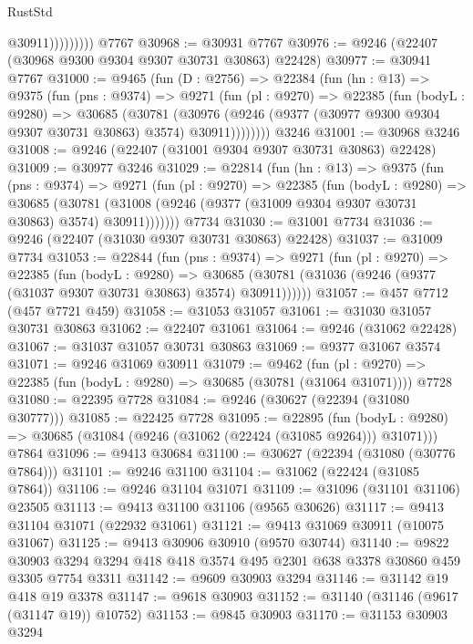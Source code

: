 \begin{lexlean}{RustStd}
\begin{coremodule}
                      @30911)))))))))
    @7767
@30968 := @30931 @7767
@30976 := @9246 (@22407 (@30968 @9300 @9304 @9307 @30731 @30863) @22428)
@30977 := @30941 @7767
@31000 := @9465
    (fun (D : @2756) =>
    @22384
      (fun (hn : @13) =>
      @9375
        (fun (pns : @9374) =>
        @9271
          (fun (pl : @9270) =>
          @22385
            (fun (bodyL : @9280) =>
            @30685
              (@30781
                (@30976 (@9246 (@9377 (@30977 @9300 @9304 @9307 @30731 @30863) @3574) @30911))))))))
    @3246
@31001 := @30968 @3246
@31008 := @9246 (@22407 (@31001 @9304 @9307 @30731 @30863) @22428)
@31009 := @30977 @3246
@31029 := @22814
    (fun (hn : @13) =>
    @9375
      (fun (pns : @9374) =>
      @9271
        (fun (pl : @9270) =>
        @22385
          (fun (bodyL : @9280) =>
          @30685
            (@30781 (@31008 (@9246 (@9377 (@31009 @9304 @9307 @30731 @30863) @3574) @30911)))))))
    @7734
@31030 := @31001 @7734
@31036 := @9246 (@22407 (@31030 @9307 @30731 @30863) @22428)
@31037 := @31009 @7734
@31053 := @22844
    (fun (pns : @9374) =>
    @9271
      (fun (pl : @9270) =>
      @22385
        (fun (bodyL : @9280) =>
        @30685 (@30781 (@31036 (@9246 (@9377 (@31037 @9307 @30731 @30863) @3574) @30911))))))
@31057 := @457 @7712 (@457 @7721 @459)
@31058 := @31053 @31057
@31061 := @31030 @31057 @30731 @30863
@31062 := @22407 @31061
@31064 := @9246 (@31062 @22428)
@31067 := @31037 @31057 @30731 @30863
@31069 := @9377 @31067 @3574
@31071 := @9246 @31069 @30911
@31079 := @9462
    (fun (pl : @9270) => @22385 (fun (bodyL : @9280) => @30685 (@30781 (@31064 @31071))))
    @7728
@31080 := @22395 @7728
@31084 := @9246 (@30627 (@22394 (@31080 @30777)))
@31085 := @22425 @7728
@31095 := @22895
    (fun (bodyL : @9280) => @30685 (@31084 (@9246 (@31062 (@22424 (@31085 @9264))) @31071)))
    @7864
@31096 := @9413 @30684
@31100 := @30627 (@22394 (@31080 (@30776 @7864)))
@31101 := @9246 @31100
@31104 := @31062 (@22424 (@31085 @7864))
@31106 := @9246 @31104 @31071
@31109 := @31096 (@31101 @31106) @23505
@31113 := @9413 @31100 @31106 (@9565 @30626)
@31117 := @9413 @31104 @31071 (@22932 @31061)
@31121 := @9413 @31069 @30911 (@10075 @31067)
@31125 := @9413 @30906 @30910 (@9570 @30744)
@31140 := @9822
    @30903
    @3294
    @3294
    @418
    @418
    @3574
    @495
    @2301
    @638
    @3378
    @30860
    @459
    @3305
    @7754
    @3311
@31142 := @9609 @30903 @3294
@31146 := @31142 @19 @418 @19 @3378
@31147 := @9618 @30903
@31152 := @31140 (@31146 (@9617 (@31147 @19)) @10752)
@31153 := @9845 @30903
@31170 := @31153
    @30903
    @3294

\end{coremodule}
\end{lexlean}
